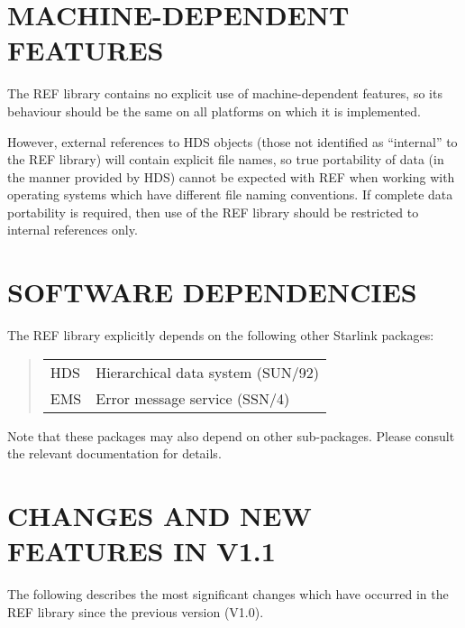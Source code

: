 \section{MACHINE-DEPENDENT FEATURES}

The REF library contains no explicit use of machine-dependent features, so its
behaviour should be the same on all platforms on which it is implemented.

However, external references to HDS objects (those not identified as
``internal'' to the REF library) will contain explicit file names, so true
portability of data (in the manner provided by HDS) cannot be expected with REF
when working with operating systems which have different file naming
conventions. If complete data portability is required, then use of the REF
library should be restricted to internal references only.

\section{SOFTWARE DEPENDENCIES}

The REF library explicitly depends on the following other Starlink packages:

\begin{quote}
\begin{tabular}{ll}
HDS & Hierarchical data system (SUN/92)\\
EMS & Error message service (SSN/4)
\end{tabular}
\end{quote}

Note that these packages may also depend on other sub-packages. Please consult
the relevant documentation for details.

\newpage
\section{CHANGES AND NEW FEATURES IN V1.1}

The following describes the most significant changes which have occurred in the
REF library since the previous version (V1.0).

